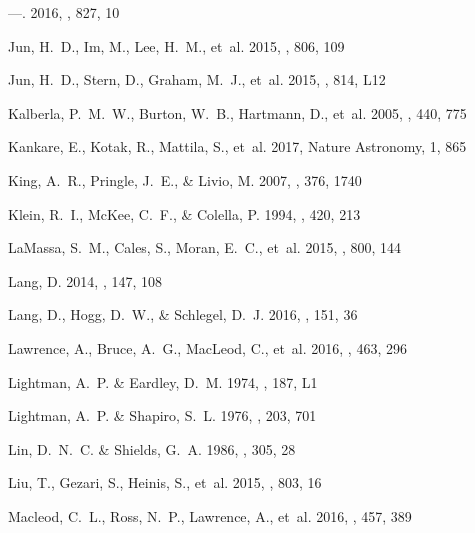\documentclass[iop]{emulateapj}
\begin{document}
\begin{thebibliography}{84}
---. 2016, \apj, 827, 10

Jun, H.~D., Im, M., Lee, H.~M., {et~al.} 2015{}, \apj, 806, 109

Jun, H.~D., Stern, D., Graham, M.~J., {et~al.} 2015{}, \apj, 814,
  L12

Kalberla, P.~M.~W., Burton, W.~B., Hartmann, D., {et~al.} 2005, \aap, 440, 775

Kankare, E., Kotak, R., Mattila, S., {et~al.} 2017, Nature Astronomy, 1, 865

King, A.~R., Pringle, J.~E., \& Livio, M. 2007, \mnras, 376, 1740

Klein, R.~I., McKee, C.~F., \& Colella, P. 1994, \apj, 420, 213

LaMassa, S.~M., Cales, S., Moran, E.~C., {et~al.} 2015, \apj, 800, 144

Lang, D. 2014, \aj, 147, 108

Lang, D., Hogg, D.~W., \& Schlegel, D.~J. 2016, \aj, 151, 36

Lawrence, A., Bruce, A.~G., MacLeod, C., {et~al.} 2016, \mnras, 463, 296

Lightman, A.~P. \& Eardley, D.~M. 1974, \apj, 187, L1

Lightman, A.~P. \& Shapiro, S.~L. 1976, \apj, 203, 701

Lin, D.~N.~C. \& Shields, G.~A. 1986, \apj, 305, 28

Liu, T., Gezari, S., Heinis, S., {et~al.} 2015, \apj, 803, 16

Macleod, C.~L., Ross, N.~P., Lawrence, A., {et~al.} 2016, \mnras, 457, 389


\end{thebibliography}
\end{document}
